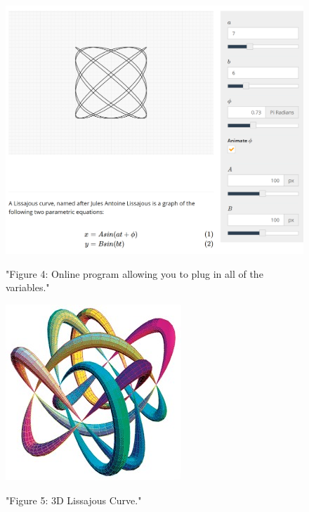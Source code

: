 \begin{figure}[h]
    \centering
    \includegraphics[scale=0.3]{Images/lissajous.PNG}
    \cite{Onlinecurve}
    \caption{"Figure 4: Online program allowing you to plug in all of the variables."}
    \label{fig:my_label}
\end{figure}
\newpage
\begin{figure}[h]
    \centering
    \includegraphics[scale=1.5]{Images/3dcurve.jpg}
    \cite{3DCurve}
    \caption{"Figure 5: 3D Lissajous Curve."}
    \label{fig:my_label}
\end{figure}
